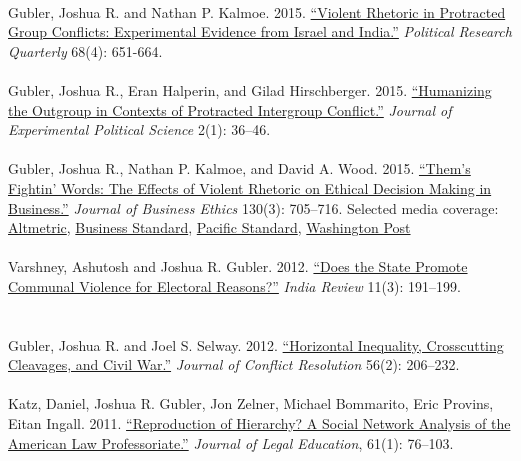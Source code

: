 \documentclass[10pt]{article}
\begin{document}
\ \\
Gubler, Joshua R. and Nathan P. Kalmoe. 2015. \href{http://journals.sagepub.com/doi/abs/10.1177/1065912915608947?journalCode=prqb}{``Violent Rhetoric in Protracted Group Conflicts: Experimental Evidence from Israel and India.''} \textit{Political Research Quarterly} 68(4): 651-664.\\
\ \\
Gubler, Joshua R., Eran Halperin, and Gilad Hirschberger. 2015. \href{https://www.cambridge.org/core/journals/journal-of-experimental-political-science/article/humanizing-the-outgroup-in-contexts-of-protracted-intergroup-conflict/977DB097FC7E983960880E84A32E8CB9}{``Humanizing the Outgroup in Contexts of Protracted Intergroup Conflict.''} \textit{Journal of Experimental Political Science} 2(1): 36--46.\\
\ \\
Gubler, Joshua R., Nathan P. Kalmoe, and David A. Wood. 2015. \href{http://link.springer.com/article/10.1007/s10551-014-2256-y}{``Them’s Fightin' Words: The Effects of Violent Rhetoric on Ethical Decision Making in Business.''} \textit{Journal of Business Ethics} 130(3): 705--716. Selected media coverage: \href{https://www.altmetric.com/details/2532997}{Altmetric}, \href{http://www.business-standard.com/article/news-ians/violent-rhetoric-from-ceos-make-rivals-to-play-dirty-114072301089_1.html}{Business Standard}, \href{https://psmag.com/how-a-ceo-s-fiery-battle-speeches-can-shape-ethical-behavior-90fec1361436}{Pacific Standard}, \href{https://www.washingtonpost.com/business/on-small-business/new-study-reveals-the-powerful-and-bizarre-effects-of-using-violent-rhetoric-at-work/2014/07/22/601ef92a-11bb-11e4-8936-26932bcfd6ed_story.html?utm_term=.ccf34e5ee2d1}{Washington Post}\\
\ \\
Varshney, Ashutosh and Joshua R. Gubler. 2012. \href{http://www.tandfonline.com/doi/abs/10.1080/14736489.2012.705634}{``Does the State Promote Communal Violence for Electoral Reasons?''}  \textit{India Review} 11(3): 191--199.\\
\ \\
\ \\
Gubler, Joshua R. and Joel S. Selway. 2012. \href{http://journals.sagepub.com/doi/abs/10.1177/0022002711431416}{``Horizontal Inequality, Crosscutting Cleavages, and Civil War.''} \textit{Journal of Conflict Resolution} 56(2): 206--232.\\
\ \\
Katz, Daniel, Joshua R. Gubler, Jon Zelner, Michael Bommarito, Eric Provins, Eitan Ingall. 2011. \href{http://jle.aals.org/home/vol61/iss1/5/}{``Reproduction of Hierarchy? A Social Network Analysis of the American Law Professoriate.''} \textit{Journal of Legal Education}, 61(1): 76--103.
\\
\end{document}
